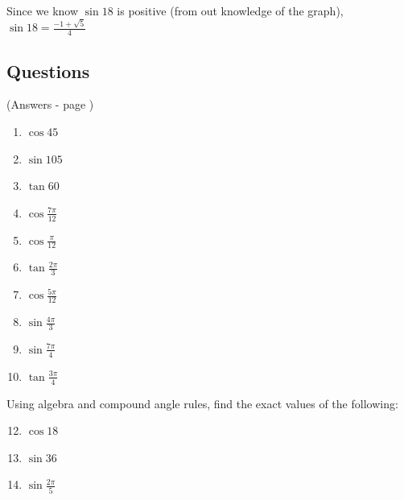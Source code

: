 \documentclass[../main.tex]{subfiles}
\begin{document}
Since we know $\sin{18}$ is positive (from out knowledge of the graph), $\sin{18}=\frac{-1+\sqrt{5}}{4}$

\pagebreak

\subsection*{Questions} 
\label{Exact trig values}
(Answers - page {\pageref{Exact trig values answers}})
\begin{enumerate}
    \item $\cos{45}$

    \item $\sin{105}$
    
    \item $\tan{60}$
    
    \item $\cos{\frac{7\pi}{12}}$
    
    \item $\cos{\frac{\pi}{12}}$
    
    \item $\tan{\frac{2\pi}{3}}$
    
    \item $\cos{\frac{5\pi}{12}}$
    
    \item $\sin{\frac{4\pi}{3}}$
    
    \item $\sin{\frac{7\pi}{4}}$
    
    \item $\tan{\frac{3\pi}{4}}$

\end{enumerate}
Using algebra and compound angle rules, find the exact values of the following:
\begin{enumerate}
    \setcounter{enumi}{11}
    \item $\cos{18}$
    
    \item $\sin{36}$
    
    \item $\sin{\frac{2\pi}{5}}$
    
\end{enumerate}
\end{document}
